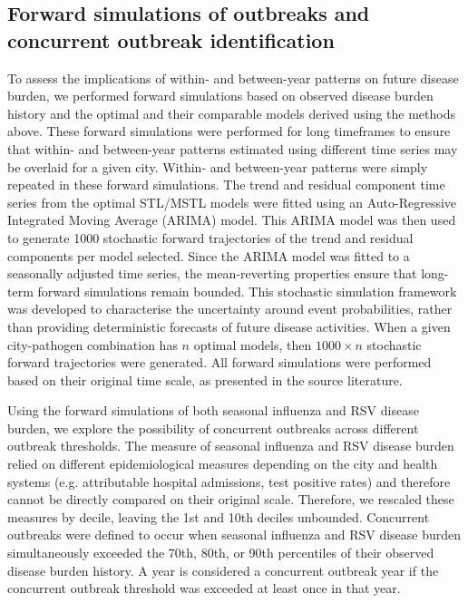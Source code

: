 \subsection{Forward simulations of outbreaks and concurrent outbreak identification}
To assess the implications of within- and between-year patterns on future disease burden, we performed forward simulations based on observed disease burden history and the optimal and their comparable models derived using the methods above.
These forward simulations were performed for long timeframes to ensure that within- and between-year patterns estimated using different time series may be overlaid for a given city.
Within- and between-year patterns were simply repeated in these forward simulations.
The trend and residual component time series from the optimal STL/MSTL models were fitted using an Auto-Regressive Integrated Moving Average (ARIMA) model.
This ARIMA model was then used to generate 1000 stochastic forward trajectories of the trend and residual components per model selected.
Since the ARIMA model was fitted to a seasonally adjusted time series, the mean-reverting properties ensure that long-term forward simulations remain bounded.
This stochastic simulation framework was developed to characterise the uncertainty around event probabilities, rather than providing deterministic forecasts of future disease activities.
When a given city-pathogen combination has $n$ optimal models, then $1000 \times n$ stochastic forward trajectories were generated. 
All forward simulations were performed based on their original time scale, as presented in the source literature.

Using the forward simulations of both seasonal influenza and RSV disease burden, we explore the possibility of concurrent outbreaks across different outbreak thresholds. 
The measure of seasonal influenza and RSV disease burden relied on different epidemiological measures depending on the city and health systems (e.g. attributable hospital admissions, test positive rates) and therefore cannot be directly compared on their original scale.
Therefore, we rescaled these measures by decile, leaving the 1st and 10th deciles unbounded.
Concurrent outbreaks were defined to occur when seasonal influenza and RSV disease burden simultaneously exceeded the 70th, 80th, or 90th percentiles of their observed disease burden history.
A year is considered a concurrent outbreak year if the concurrent outbreak threshold was exceeded at least once in that year.

